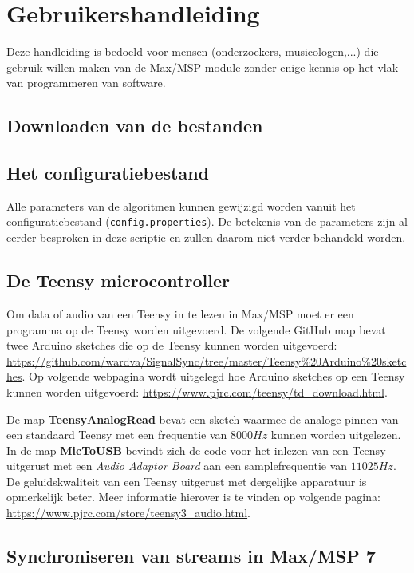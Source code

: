 \chapter{Gebruikershandleiding}
\label{appendix-d}

Deze handleiding is bedoeld voor mensen (onderzoekers, musicologen,...) die gebruik willen maken van de Max/MSP module zonder enige kennis op het vlak van programmeren van software.

\section{Downloaden van de bestanden}



\section*{Het configuratiebestand}

Alle parameters van de algoritmen kunnen gewijzigd worden vanuit het configuratiebestand (\texttt{config.properties}). De betekenis van de parameters zijn al eerder besproken in deze scriptie en zullen daarom niet verder behandeld worden.

\section*{De Teensy microcontroller}
\label{read-teensy}

Om data of audio van een Teensy in te lezen in Max/MSP moet er een programma op de Teensy worden uitgevoerd.
De volgende GitHub map bevat twee Arduino sketches die op de Teensy kunnen worden uitgevoerd: \url{https://github.com/wardva/SignalSync/tree/master/Teensy\%20Arduino\%20sketches}. Op volgende webpagina wordt uitgelegd hoe Arduino sketches op een Teensy kunnen worden uitgevoerd: \url{https://www.pjrc.com/teensy/td_download.html}. 

De map \textbf{TeensyAnalogRead} bevat een sketch waarmee de analoge pinnen van een standaard Teensy met een frequentie van $8000Hz$ kunnen worden uitgelezen. In de map \textbf{MicToUSB} bevindt zich de code voor het inlezen van een Teensy uitgerust met een \textit{Audio Adaptor Board} aan een samplefrequentie van $11025Hz$. De geluidskwaliteit van een Teensy uitgerust met dergelijke apparatuur is opmerkelijk beter. Meer informatie hierover is te vinden op volgende pagina: \url{https://www.pjrc.com/store/teensy3_audio.html}.

\section*{Synchroniseren van streams in Max/MSP 7}

